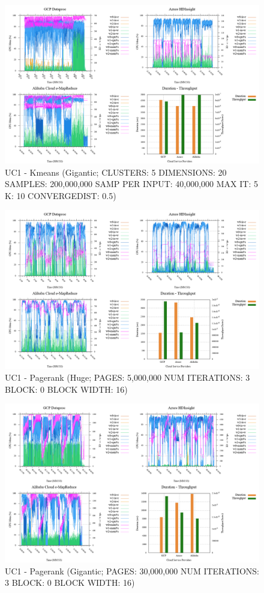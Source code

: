\documentclass[review]{elsarticle}
\begin{document}
\begin{figure}[b]
	\caption{UC1 - Kmeans (Gigantic; CLUSTERS: 5 DIMENSIONS: 20 SAMPLES: 200,000,000 SAMP PER INPUT: 40,000,000 MAX IT: 5 K: 10 CONVERGEDIST: 0.5)}
	\includegraphics[width=\textwidth]{uc1-kmeans-g-cmidt}
	\centering
\end{figure}

\begin{figure}[b]
	\caption{UC1 - Pagerank (Huge; PAGES: 5,000,000 NUM ITERATIONS: 3 BLOCK: 0 BLOCK WIDTH: 16)}
	\includegraphics[width=\textwidth]{uc1-page-h-cmidt}
	\centering
\end{figure}

\begin{figure}[b]
	\caption{UC1 - Pagerank (Gigantic; PAGES: 30,000,000 NUM ITERATIONS: 3 BLOCK: 0 BLOCK WIDTH: 16)}
	\includegraphics[width=\textwidth]{uc1-page-g-cmidt}
	\centering
\end{figure}
\end{document}
